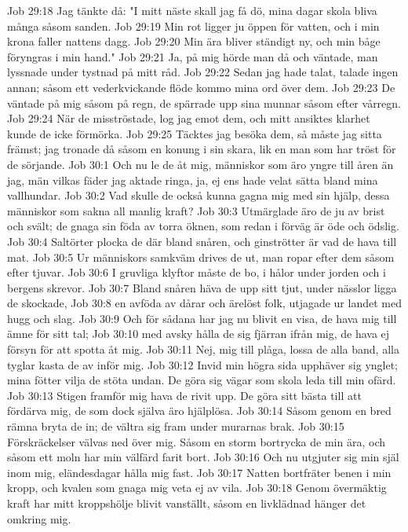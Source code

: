 Job 29:18  Jag tänkte då: "I mitt näste skall jag få dö, mina dagar skola bliva många såsom sanden.
Job 29:19  Min rot ligger ju öppen för vatten, och i min krona faller nattens dagg.
Job 29:20  Min ära bliver ständigt ny, och min båge föryngras i min hand."
Job 29:21  Ja, på mig hörde man då och väntade, man lyssnade under tystnad på mitt råd.
Job 29:22  Sedan jag hade talat, talade ingen annan; såsom ett vederkvickande flöde kommo mina ord över dem.
Job 29:23  De väntade på mig såsom på regn, de spärrade upp sina munnar såsom efter vårregn.
Job 29:24  När de misströstade, log jag emot dem, och mitt ansiktes klarhet kunde de icke förmörka.
Job 29:25  Täcktes jag besöka dem, så måste jag sitta främst; jag tronade då såsom en konung i sin skara, lik en man som har tröst för de sörjande.
Job 30:1  Och nu le de åt mig, människor som äro yngre till åren än jag, män vilkas fäder jag aktade ringa, ja, ej ens hade velat sätta bland mina vallhundar.
Job 30:2  Vad skulle de också kunna gagna mig med sin hjälp, dessa människor som sakna all manlig kraft?
Job 30:3  Utmärglade äro de ju av brist och svält; de gnaga sin föda av torra öknen, som redan i förväg är öde och ödslig.
Job 30:4  Saltörter plocka de där bland snåren, och ginströtter är vad de hava till mat.
Job 30:5  Ur människors samkväm drives de ut, man ropar efter dem såsom efter tjuvar.
Job 30:6  I gruvliga klyftor måste de bo, i hålor under jorden och i bergens skrevor.
Job 30:7  Bland snåren häva de upp sitt tjut, under nässlor ligga de skockade,
Job 30:8  en avföda av dårar och ärelöst folk, utjagade ur landet med hugg och slag.
Job 30:9  Och för sådana har jag nu blivit en visa, de hava mig till ämne för sitt tal;
Job 30:10  med avsky hålla de sig fjärran ifrån mig, de hava ej försyn för att spotta åt mig.
Job 30:11  Nej, mig till plåga, lossa de alla band, alla tyglar kasta de av inför mig.
Job 30:12  Invid min högra sida upphäver sig ynglet; mina fötter vilja de stöta undan. De göra sig vägar som skola leda till min ofärd.
Job 30:13  Stigen framför mig hava de rivit upp. De göra sitt bästa till att fördärva mig, de som dock själva äro hjälplösa.
Job 30:14  Såsom genom en bred rämna bryta de in; de vältra sig fram under murarnas brak.
Job 30:15  Förskräckelser välvas ned över mig. Såsom en storm bortrycka de min ära, och såsom ett moln har min välfärd farit bort.
Job 30:16  Och nu utgjuter sig min själ inom mig, eländesdagar hålla mig fast.
Job 30:17  Natten bortfräter benen i min kropp, och kvalen som gnaga mig veta ej av vila.
Job 30:18  Genom övermäktig kraft har mitt kroppshölje blivit vanställt, såsom en livklädnad hänger det omkring mig.
